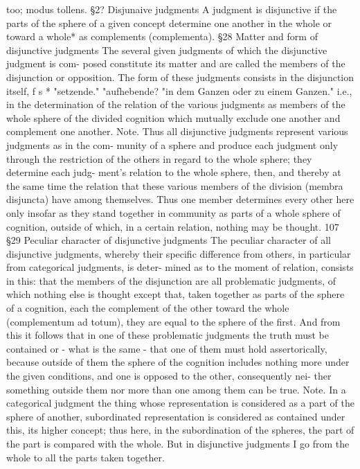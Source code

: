 too; modus tollens.
§2?
Disjunaive judgments
A judgment is disjunctive if the parts of the sphere of a given concept
determine one another in the whole or toward a whole* as complements
(complementa).
§28
Matter and form of disjunctive judgments
The several given judgments of which the disjunctive judgment is com-
posed constitute its matter and are called the members of the disjunction or
opposition. The form of these judgments consists in the disjunction itself,
f
s
*
"setzende."
"aufhebende?
"in dem Ganzen oder zu einem Ganzen."
i.e., in the determination of the relation of the various judgments as
members of the whole sphere of the divided cognition which mutually
exclude one another and complement one another.
Note.
Thus all disjunctive judgments represent various judgments as in the com-
munity of a sphere and produce each judgment only through the restriction
of the others in regard to the whole sphere; they determine each judg-
ment's relation to the whole sphere, then, and thereby at the same time the
relation that these various members of the division (membra disjuncta) have
among themselves. Thus one member determines every other here only
insofar as they stand together in community as parts of a whole sphere of
cognition, outside of which, in a certain relation, nothing may be thought.
107
§29
Peculiar character of disjunctive judgments
The peculiar character of all disjunctive judgments, whereby their specific
difference from others, in particular from categorical judgments, is deter-
mined as to the moment of relation, consists in this: that the members of
the disjunction are all problematic judgments, of which nothing else is
thought except that, taken together as parts of the sphere of a cognition,
each the complement of the other toward the whole (complementum ad
totum), they are equal to the sphere of the first. And from this it follows
that in one of these problematic judgments the truth must be contained
or - what is the same - that one of them must hold assertorically, because
outside of them the sphere of the cognition includes nothing more under
the given conditions, and one is opposed to the other, consequently nei-
ther something outside them nor more than one among them can be true.
Note.
In a categorical judgment the thing whose representation is considered as a
part of the sphere of another, subordinated representation is considered as
contained under this, its higher concept; thus here, in the subordination of
the spheres, the part of the part is compared with the whole. But in
disjunctive judgments I go from the whole to all the parts taken together.
